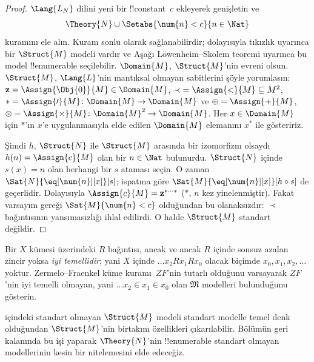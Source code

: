 \documentclass[../../../include/open-logic-section]{subfiles}
\begin{document}
\begin{proof}
$\Lang{L_N}$ dilini yeni bir !!{constant}~$c$ ekleyerek genişletin ve
\[
\Theory{N} \cup \Setabs{\num{n} < c}{n \in \Nat}
\]
kuramını ele alın. Kuram sonlu olarak sağlanabilirdir; dolayısıyla tıkızlık
uyarınca bir $\Struct{M}$ modeli vardır ve Aşağı Löwenheim--Skolem teoremi
uyarınca bu model !!{enumerable} seçilebilir. $\Domain{M}$, $\Struct{M}$'nin
evreni olsun. $\Struct{M}$, $\Lang{L}$'nin mantıksal olmayan sabitlerini
şöyle yorumlasın: $\mathbf{z} = \Assign{\Obj{0}}{M} \in \Domain{M}$,
${\prec} = \Assign{<}{M} \subseteq M^2$, $* = \Assign{\prime}{M} \colon
\Domain{M} \to \Domain{M}$ ve $\oplus = \Assign{+}{M}$,
$\otimes = \Assign{\times}{M} \colon \Domain{M}^2 \to \Domain{M}$. Her
$x \in \Domain{M}$ için $*$'ın $x$'e uygulanmasıyla elde edilen
$\Domain{M}$ elemanını $x^*$ ile gösteririz.

Şimdi $h$, $\Struct{N}$ ile $\Struct{M}$ arasında bir izomorfizm olsaydı
$h(n) = \Assign{c}{M}$ olan bir $n \in \Nat$ bulunurdu. $\Struct{N}$ içinde
$s(x)=n$ olan herhangi bir $s$ ataması seçin. O zaman
$\Sat{N}{\eq[\num{n}][x]}[s]$;  ispatına göre
$\Sat{M}{\eq[\num{n}][x]}[h \circ s]$ de geçerlidir. Dolayısıyla
$\Assign{c}{M} = \mathbf{z}^{*\cdots *}$ ($*$, $n$ kez yinelenmiştir).
Fakat varsayım gereği $\Sat{M}{\num{n} < c}$ olduğundan bu olanaksızdır:
$\prec$ bağıntısının yansımasızlığı ihlal edilirdi. O halde $\Struct{M}$
standart değildir.
\end{proof}

\begin{prob}
Bir $X$ kümesi üzerindeki $R$ bağıntısı, ancak ve ancak $R$ içinde sonsuz
azalan zincir yoksa \emph{iyi temellidir}; yani $X$ içinde
$\dots x_2Rx_1Rx_0$ olacak biçimde $x_0,x_1,x_2,\dots$ yoktur.
Zermelo--Fraenkel küme kuramı~$ZF$'nin tutarlı olduğunu varsayarak $ZF$'nin
iyi temelli olmayan, yani $\dots x_2 \in x_1 \in x_0$ olan
$\mathfrak{M}$ modelleri bulunduğunu gösterin.
\end{prob}

 içindeki standart olmayan $\Struct{M}$ modeli standart
modelle temel denk olduğundan $\Struct{M}$'nin birtakım özellikleri
çıkarılabilir. Bölümün geri kalanında bu işi yaparak $\Theory{N}$'nin
!!{enumerable} standart olmayan modellerinin kesin bir nitelemesini elde
edeceğiz.
\end{document}
